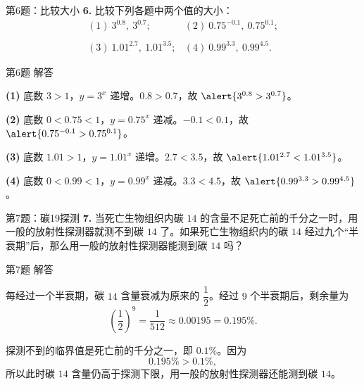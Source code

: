 \documentclass[10pt,aspectratio=169,serif,fleqn]{beamer}
\begin{document}
\begin{frame}[t]{第6题：比较大小}
\textbf{6.} 比较下列各题中两个值的大小：
\[
\begin{array}{ll}
(1)\ 3^{0.8},\ 3^{0.7};&
(2)\ 0.75^{-0.1},\ 0.75^{0.1};\\
 & \\
(3)\ 1.01^{2.7},\ 1.01^{3.5};&
(4)\ 0.99^{3.3},\ 0.99^{4.5}.
\end{array}
\]
\end{frame}

\begin{frame}[t]{第6题 解答}
\begin{tcolorbox}[colback=orange!10,colframe=orange,title=\textbf{解}]
\textbf{(1)} 底数 $3>1$，$y=3^{x}$ 递增。$0.8>0.7$，故 $\alert{3^{0.8}>3^{0.7}}$。

\vspace{0.4em}
\textbf{(2)} 底数 $0<0.75<1$，$y=0.75^{x}$ 递减。$-0.1<0.1$，故 $\alert{0.75^{-0.1}>0.75^{0.1}}$。

\vspace{0.4em}
\textbf{(3)} 底数 $1.01>1$，$y=1.01^{x}$ 递增。$2.7<3.5$，故 $\alert{1.01^{2.7}<1.01^{3.5}}$。

\vspace{0.4em}
\textbf{(4)} 底数 $0<0.99<1$，$y=0.99^{x}$ 递减。$3.3<4.5$，故 $\alert{0.99^{3.3}>0.99^{4.5}}$。
\end{tcolorbox}
\end{frame}

\begin{frame}[t]{第7题：碳19探测}
\textbf{7.} 当死亡生物组织内碳 $14$ 的含量不足死亡前的千分之一时，用一般的放射性探测器就测不到碳 $14$ 了。如果死亡生物组织内的碳 $14$ 经过九个“半衰期”后，那么用一般的放射性探测器能测到碳 $14$ 吗？
\end{frame}

\begin{frame}[t]{第7题 解答}
\begin{tcolorbox}[colback=orange!10,colframe=orange,title=\textbf{解}]
每经过一个半衰期，碳 $14$ 含量衰减为原来的 $\dfrac{1}{2}$。经过 $9$ 个半衰期后，剩余量为
\[
\left(\frac{1}{2}\right)^{9}=\frac{1}{512}\approx 0.00195=0.195\%.
\]

\vspace{0.5em}
探测不到的临界值是死亡前的千分之一，即 $0.1\%$。因为
\[
0.195\% > 0.1\%,
\]
所以此时碳 $14$ 含量\alert{仍高于}探测下限，用一般的放射性探测器\alert{还能测到}碳 $14$。
\end{tcolorbox}
\end{frame}
\end{document}
